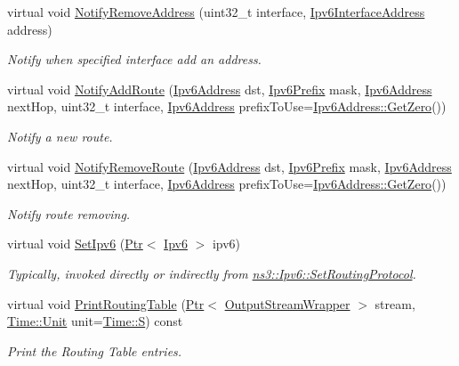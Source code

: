 \begin{DoxyCompactItemize}
virtual void \hyperlink{classns3_1_1Ipv6ListRouting_a46e2cf52e8552cc0b3373c6609be27cc}{Notify\+Remove\+Address} (uint32\+\_\+t interface, \hyperlink{classns3_1_1Ipv6InterfaceAddress}{Ipv6\+Interface\+Address} address)
\begin{DoxyCompactList}\small\item\em Notify when specified interface add an address. \end{DoxyCompactList}\item 
virtual void \hyperlink{classns3_1_1Ipv6ListRouting_a39dddd9618719875abab8c2ed9eed081}{Notify\+Add\+Route} (\hyperlink{classns3_1_1Ipv6Address}{Ipv6\+Address} dst, \hyperlink{classns3_1_1Ipv6Prefix}{Ipv6\+Prefix} mask, \hyperlink{classns3_1_1Ipv6Address}{Ipv6\+Address} next\+Hop, uint32\+\_\+t interface, \hyperlink{classns3_1_1Ipv6Address}{Ipv6\+Address} prefix\+To\+Use=\hyperlink{classns3_1_1Ipv6Address_a63a34bdb1505e05fbdd07d316d0bd7e6}{Ipv6\+Address\+::\+Get\+Zero}())
\begin{DoxyCompactList}\small\item\em Notify a new route. \end{DoxyCompactList}\item 
virtual void \hyperlink{classns3_1_1Ipv6ListRouting_a10a31c12272e77d51d1fd68b025ad2f5}{Notify\+Remove\+Route} (\hyperlink{classns3_1_1Ipv6Address}{Ipv6\+Address} dst, \hyperlink{classns3_1_1Ipv6Prefix}{Ipv6\+Prefix} mask, \hyperlink{classns3_1_1Ipv6Address}{Ipv6\+Address} next\+Hop, uint32\+\_\+t interface, \hyperlink{classns3_1_1Ipv6Address}{Ipv6\+Address} prefix\+To\+Use=\hyperlink{classns3_1_1Ipv6Address_a63a34bdb1505e05fbdd07d316d0bd7e6}{Ipv6\+Address\+::\+Get\+Zero}())
\begin{DoxyCompactList}\small\item\em Notify route removing. \end{DoxyCompactList}\item 
virtual void \hyperlink{classns3_1_1Ipv6ListRouting_ac660375f36097f4c760a2cc5e6f4aa8a}{Set\+Ipv6} (\hyperlink{classns3_1_1Ptr}{Ptr}$<$ \hyperlink{classns3_1_1Ipv6}{Ipv6} $>$ ipv6)
\begin{DoxyCompactList}\small\item\em Typically, invoked directly or indirectly from \hyperlink{classns3_1_1Ipv6_aa889d2174527a1df773d65974de83f8f}{ns3\+::\+Ipv6\+::\+Set\+Routing\+Protocol}. \end{DoxyCompactList}\item 
virtual void \hyperlink{classns3_1_1Ipv6ListRouting_a0c8272a6217b35e37b6e6ac247494890}{Print\+Routing\+Table} (\hyperlink{classns3_1_1Ptr}{Ptr}$<$ \hyperlink{classns3_1_1OutputStreamWrapper}{Output\+Stream\+Wrapper} $>$ stream, \hyperlink{classns3_1_1Time_a87a7f4d29c68b047a72d291ad660295a}{Time\+::\+Unit} unit=\hyperlink{classns3_1_1Time_a87a7f4d29c68b047a72d291ad660295aade8622b06524a328cd3a59db6ccf76af}{Time\+::S}) const 
\begin{DoxyCompactList}\small\item\em Print the Routing Table entries. \end{DoxyCompactList}\end{DoxyCompactItemize}
